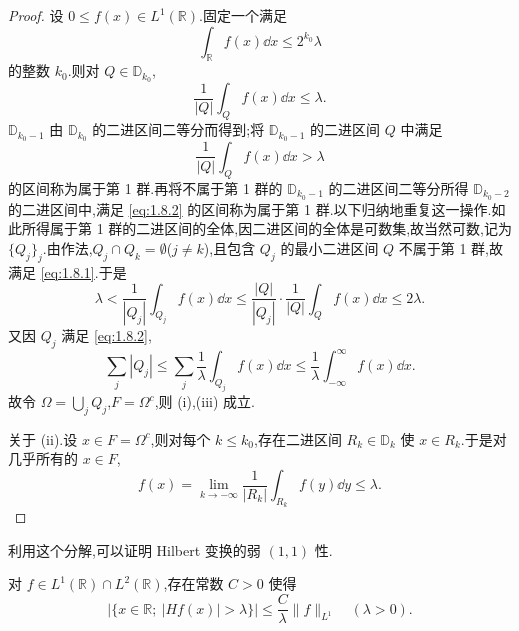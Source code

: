 \begin{proof}
设 $0 \leq f(x) \in L^{1}(\mathbb{R})$.固定一个满足
\begin{equation*}
\int_{\mathbb{R}} f(x)\dd x \leq 2^{k_{0}}\lambda
\end{equation*}
的整数 $k_{0}$.则对 $Q \in \mathbb{D}_{k_{0}}$,
\begin{equation}\tag{1.8.1}
\frac{1}{|Q|}\int_{Q} f(x)\dd x \leq \lambda.
\label{eq:1.8.1}\end{equation}
$\mathbb{D}_{k_{0}-1}$ 由 $\mathbb{D}_{k_{0}}$ 的二进区间二等分而得到;将 $\mathbb{D}_{k_{0}-1}$ 的二进区间 $Q$ 中满足
\begin{equation}\tag{1.8.2}
\frac{1}{|Q|}\int_{Q} f(x)\dd x > \lambda
\label{eq:1.8.2}\end{equation}
的区间称为属于第 1 群.再将不属于第 1 群的 $\mathbb{D}_{k_{0}-1}$ 的二进区间二等分所得 $\mathbb{D}_{k_{0}-2}$ 的二进区间中,满足 \eqref{eq:1.8.2} 的区间称为属于第 1 群.以下归纳地重复这一操作.如此所得属于第 1 群的二进区间的全体,因二进区间的全体是可数集,故当然可数,记为 $\{Q_{j}\}_{j}$.由作法,$Q_{j} \cap Q_{k} = \emptyset$($j \neq k$),且包含 $Q_{j}$ 的最小二进区间 $Q$ 不属于第 1 群,故满足 \eqref{eq:1.8.1}.于是
\begin{equation*}
\lambda < \frac{1}{|Q_{j}|}\int_{Q_{j}} f(x)\dd x \leq \frac{|Q|}{|Q_{j}|}\cdot\frac{1}{|Q|}\int_{Q} f(x)\dd x \leq 2\lambda.
\end{equation*}
又因 $Q_{j}$ 满足 \eqref{eq:1.8.2},
\begin{equation*}
\sum_{j}|Q_{j}| \leq \sum_{j}\frac{1}{\lambda}\int_{Q_{j}} f(x)\dd x \leq \frac{1}{\lambda}\int_{-\infty}^{\infty} f(x)\dd x.
\end{equation*}
故令 $\Omega = \bigcup_{j} Q_{j}$,$F = \Omega^{c}$,则 (i),(iii) 成立.

关于 (ii).设 $x \in F = \Omega^{c}$,则对每个 $k \leq k_{0}$,存在二进区间 $R_{k} \in \mathbb{D}_{k}$ 使 $x \in R_{k}$.于是对几乎所有的 $x \in F$,
\begin{equation*}
f(x) = \lim_{k \to -\infty}\frac{1}{|R_{k}|}\int_{R_{k}} f(y)\dd y \leq \lambda.
\end{equation*}
\end{proof}

利用这个分解,可以证明 Hilbert 变换的弱 $(1,1)$ 性.

\begin{theorem}\label{thm:1.8.2}
对 $f \in L^{1}(\mathbb{R}) \cap L^{2}(\mathbb{R})$,存在常数 $C > 0$ 使得
\begin{equation*}
\left|\{x \in \mathbb{R};\ |Hf(x)| > \lambda\}\right| \leq \frac{C}{\lambda}\| f \|_{L^{1}} \quad (\lambda > 0).
\end{equation*}
\end{theorem}

